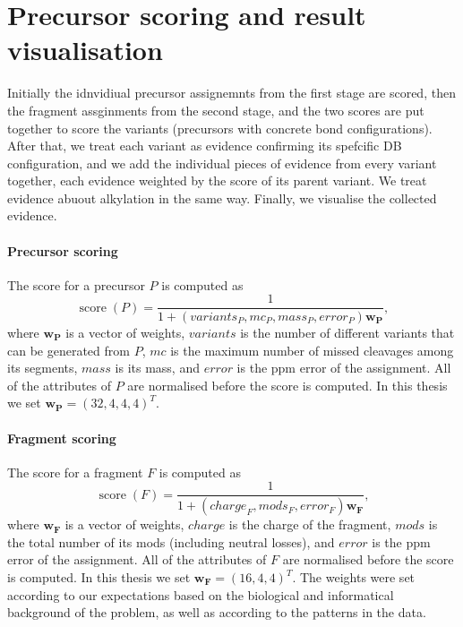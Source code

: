 \section{Precursor scoring and result visualisation}

Initially the idnvidiual precursor assignemnts from the first stage are scored, then the fragment assginments from the second stage, and the two scores are put together to score the variants (precursors with concrete bond configurations). After that, we treat each variant as evidence confirming its spefcific DB configuration, and we add the individual pieces of evidence from every variant together, each evidence weighted by the score of its parent variant. We treat evidence abuout alkylation in the same way. Finally, we visualise the collected evidence.

\paragraph{Precursor scoring} The score for a precursor \(P\) is computed as \[\operatorname{score}(P) = \frac{1}{1 + (\mathit{variants}_P, \mathit{mc}_P, \mathit{mass}_P, \mathit{error}_P)\bm{w_P}},\] where \(\bm{w_P}\) is a vector of weights, \(\mathit{variants}\) is the number of different variants that can be generated from \(P\), \(\mathit{mc}\) is the maximum number of missed cleavages among its segments, \(\mathit{mass}\) is its mass, and \(\mathit{error}\) is the ppm error of the assignment. All of the attributes of \(P\) are normalised before the score is computed. In this thesis we set \(\bm{w_P} = (32, 4, 4, 4)^T\).

\paragraph{Fragment scoring} The score for a fragment \(F\) is computed as \[\operatorname{score}(F) = \frac{1}{1 + (\mathit{charge}_F, \mathit{mods}_F, \mathit{error}_F)\bm{w_F}},\] where \(\bm{w_F}\) is a vector of weights, \(\mathit{charge}\) is the charge of the fragment, \(\mathit{mods}\) is the total number of its mods (including neutral losses), and \(\mathit{error}\) is the ppm error of the assignment. All of the attributes of \(F\) are normalised before the score is computed. In this thesis we set \(\bm{w_F} = (16, 4, 4)^T\). The weights were set according to our expectations based on the biological and informatical background of the problem, as well as according to the patterns in the data.

